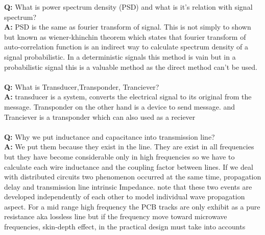 \textbf{Q:} What is power spectrum density (PSD) and what is it's relation with signal spectrum?\\
\textbf{A:} PSD is the same as fourier transform of signal. This is not simply to shown but known as wiener-khinchin theorem which states that fourier transform of auto-correlation function is an indirect way to calculate spectrum density of a signal probabilistic. In a deterministic signals this method is vain but in a probabilistic signal this is a valuable method as the direct method can't be used.\\
\\\textbf{Q:} What is Transducer,Transponder, Tranciever?\\
\textbf{A:} transducer is a system, converts the electrical signal to its original from the message. Transponder on the other hand is a device to send message. and Tranciever is a transponder which can also used as a reciever\\
\\\textbf{Q:} Why we put inductance and capacitance into transmission line?\\
\textbf{A:} We put them because they exist in the line. They are exist in all frequencies but they have become considerable only in high frequencies so we have to calculate each wire inductance and the coupling factor between lines. If we deal with distributed circuits two phenomenon occurred at the same time, propagation delay and transmission line intrinsic Impedance. note that these two events are developed independently of each other to model individual wave propagation aspect.
For a mid range high frequency the PCB tracks are only exhibit as a pure resistance aka lossless line but if the frequency move toward microwave frequencies, skin-depth effect, in the practical design must take into accounts
